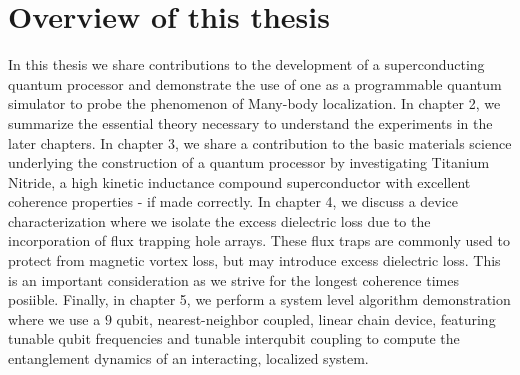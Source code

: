 \section{Overview of this thesis}
In this thesis we share contributions to the development of a superconducting quantum processor
and demonstrate the use of one as a programmable quantum simulator to probe the phenomenon of Many-body localization.
In chapter 2, we summarize the essential theory necessary to understand the experiments in the later chapters.
In chapter 3, we share a contribution to the basic materials science underlying the construction of a quantum processor by investigating Titanium Nitride,
a high kinetic inductance compound superconductor with excellent coherence properties - if made correctly.
In chapter 4, we discuss a device characterization where we isolate the excess dielectric loss due to the incorporation of flux trapping hole arrays.
These flux traps are commonly used to protect from magnetic vortex loss, but may introduce excess dielectric loss.
This is an important consideration as we strive for the longest coherence times posiible.
Finally, in chapter 5, we perform a system level algorithm demonstration where we use a $9$ qubit, nearest-neighbor coupled,
linear chain device, featuring tunable qubit frequencies and tunable interqubit coupling to compute the entanglement dynamics of an interacting, localized system.
